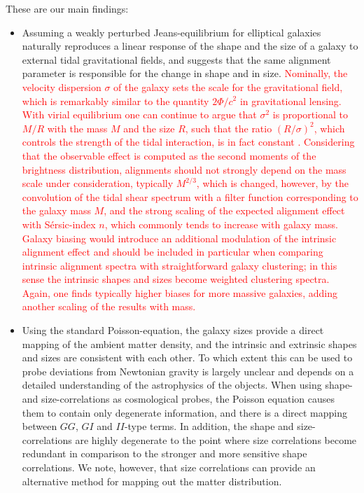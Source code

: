 \documentclass[a4paper,fleqn,usenatbib]{mnras}
\newcommand\spirou[1]{\textcolor{red}{#1}}
\begin{document}
These are our main findings:
\begin{itemize}
\item{Assuming a weakly perturbed Jeans-equilibrium for elliptical galaxies naturally reproduces a linear response of the shape and the size of a galaxy to external tidal gravitational fields, and suggests that the same alignment parameter is responsible for the change in shape and in size. \spirou{Nominally, the velocity dispersion $\sigma$ of the galaxy sets the scale for the gravitational field, which is remarkably similar to the quantity $2\Phi/c^2$ in gravitational lensing. With virial equilibrium one can continue to argue that $\sigma^2$ is proportional to $M/R$ with the mass $M$ and the size $R$, such that the ratio $(R/\sigma)^2$, which controls the strength of the tidal interaction, is in fact constant \citep[compare][]{piras_mass_2018}. Considering that the observable effect is computed as the second moments of the brightness distribution, alignments should not strongly depend on the mass scale under consideration, typically $M^{2/3}$, which is changed, however, by the convolution of the tidal shear spectrum with a filter function corresponding to the galaxy mass $M$, and the strong scaling of the expected alignment effect with S{\'e}rsic-index $n$, which commonly tends to increase with galaxy mass. Galaxy biasing would introduce an additional modulation of the intrinsic alignment effect and should be included in particular when comparing intrinsic alignment spectra with straightforward galaxy clustering; in this sense the intrinsic shapes and sizes become weighted clustering spectra. Again, one finds typically higher biases for more massive galaxies, adding another scaling of the results with mass.}}

\item{Using the standard Poisson-equation, the galaxy sizes provide a direct mapping of the ambient matter density, and  the intrinsic and extrinsic shapes and sizes are consistent with each other. To which extent this can be used to probe deviations from Newtonian gravity is largely unclear and depends on a detailed understanding of the astrophysics of the objects. When using shape- and size-correlations as cosmological probes, the Poisson equation causes them to contain only degenerate information, and there is a direct mapping between $GG$, $GI$ and $II$-type terms. In addition, the shape and size-correlations are highly degenerate to the point where size correlations become redundant in comparison to the stronger and more sensitive shape correlations. We note, however, that size correlations can provide an alternative method for mapping out the matter distribution.}


\end{itemize}
\end{document}
